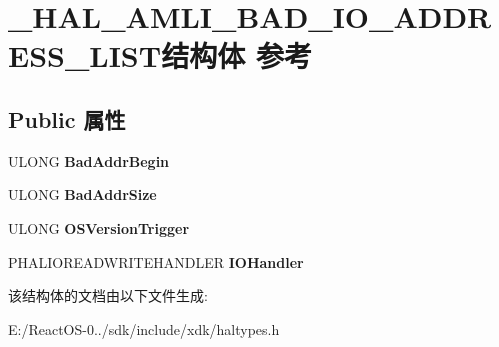 \hypertarget{struct___h_a_l___a_m_l_i___b_a_d___i_o___a_d_d_r_e_s_s___l_i_s_t}{}\section{\+\_\+\+H\+A\+L\+\_\+\+A\+M\+L\+I\+\_\+\+B\+A\+D\+\_\+\+I\+O\+\_\+\+A\+D\+D\+R\+E\+S\+S\+\_\+\+L\+I\+S\+T结构体 参考}
\label{struct___h_a_l___a_m_l_i___b_a_d___i_o___a_d_d_r_e_s_s___l_i_s_t}
\subsection*{Public 属性}
\begin{DoxyCompactItemize}
\item 
\mbox{\label{struct___h_a_l___a_m_l_i___b_a_d___i_o___a_d_d_r_e_s_s___l_i_s_t_a07975c6105cb8bdbe15eb08407399587}} 
U\+L\+O\+NG {\bfseries Bad\+Addr\+Begin}
\item 
\mbox{\label{struct___h_a_l___a_m_l_i___b_a_d___i_o___a_d_d_r_e_s_s___l_i_s_t_ae482e64ca2fc888fe927df7af5444202}} 
U\+L\+O\+NG {\bfseries Bad\+Addr\+Size}
\item 
\mbox{\label{struct___h_a_l___a_m_l_i___b_a_d___i_o___a_d_d_r_e_s_s___l_i_s_t_a94a6018a1874f5f6b0a6c22f33eea24b}} 
U\+L\+O\+NG {\bfseries O\+S\+Version\+Trigger}
\item 
\mbox{\label{struct___h_a_l___a_m_l_i___b_a_d___i_o___a_d_d_r_e_s_s___l_i_s_t_a3def8991222f3fb80166a59c55ea1857}} 
P\+H\+A\+L\+I\+O\+R\+E\+A\+D\+W\+R\+I\+T\+E\+H\+A\+N\+D\+L\+ER {\bfseries I\+O\+Handler}
\end{DoxyCompactItemize}


该结构体的文档由以下文件生成\+:\begin{DoxyCompactItemize}
\item 
E\+:/\+React\+O\+S-\/0../sdk/include/xdk/haltypes.\+h\end{DoxyCompactItemize}
